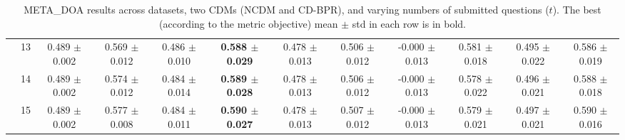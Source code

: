 \begin{table*}[t]
{\begin{tabular}{%
  ll
  @{\quad}
  c@{\hskip 4pt}c
  @{\quad\quad}
  c@{\hskip 4pt}c
  @{\quad\quad}
  c@{\hskip 4pt}c
  @{\quad\quad}
  c@{\hskip 4pt}c
  @{\quad\quad}
  c@{\hskip 4pt}c
}
        & 13 & 0.489 $\pm$ 0.002 & 0.569 $\pm$ 0.012 & 0.486 $\pm$ 0.010 & \textbf{0.588 $\pm$ 0.029} & 0.478 $\pm$ 0.013 & 0.506 $\pm$ 0.012 & -0.000 $\pm$ 0.013 & 0.581 $\pm$ 0.018 & 0.495 $\pm$ 0.022 & 0.586 $\pm$ 0.019 \\
        & 14 & 0.489 $\pm$ 0.002 & 0.574 $\pm$ 0.012 & 0.484 $\pm$ 0.014 & \textbf{0.589 $\pm$ 0.028} & 0.478 $\pm$ 0.013 & 0.506 $\pm$ 0.012 & -0.000 $\pm$ 0.013 & 0.578 $\pm$ 0.022 & 0.496 $\pm$ 0.021 & 0.588 $\pm$ 0.018 \\
        & 15 & 0.489 $\pm$ 0.002 & 0.577 $\pm$ 0.008 & 0.484 $\pm$ 0.011 & \textbf{0.590 $\pm$ 0.027} & 0.478 $\pm$ 0.013 & 0.507 $\pm$ 0.012 & -0.000 $\pm$ 0.013 & 0.579 $\pm$ 0.021 & 0.497 $\pm$ 0.021 & 0.590 $\pm$ 0.016 \\
\bottomrule
\end{tabular}
}
\caption{META_DOA results across datasets, two CDMs (NCDM and CD-BPR), and varying numbers of submitted questions ($t$). The best (according to the metric objective) mean $\pm$ std in each row is in bold.}
\label{tab:results-meta_doa}
\end{table*}


